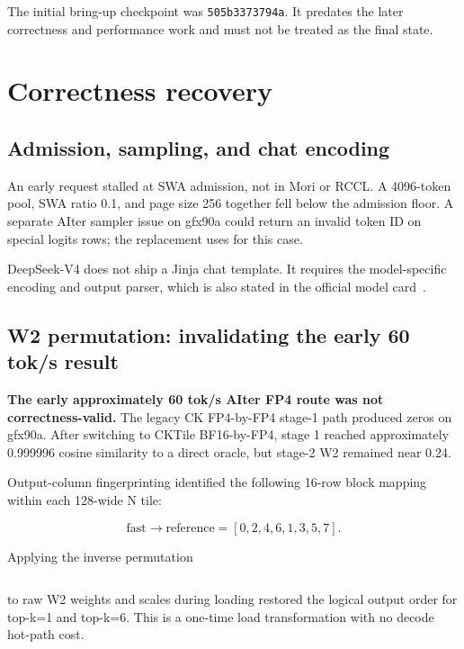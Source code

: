 \documentclass[sigplan,10pt]{acmart}
\newcommand{\risk}[1]{\textbf{#1}}
\newcommand{\commit}[1]{\texttt{#1}}
\begin{document}
The initial bring-up checkpoint was \commit{505b3373794a}. It predates the later correctness and performance work and must not be treated as the final state.

\section{Correctness recovery}

\subsection{Admission, sampling, and chat encoding}

An early request stalled at SWA admission, not in Mori or RCCL. A 4096-token pool, SWA ratio 0.1, and page size 256 together fell below the admission floor. A separate AIter sampler issue on gfx90a could return an invalid token ID on special logits rows; the replacement uses  for this case.

DeepSeek-V4 does not ship a Jinja chat template. It requires the model-specific encoding and output parser, which is also stated in the official model card~\cite{dsv4card}.

\subsection{W2 permutation: invalidating the early 60 tok/s result}

\risk{The early approximately 60 tok/s AIter FP4 route was not correctness-valid.} The legacy CK FP4-by-FP4 stage-1 path produced zeros on gfx90a. After switching to CKTile BF16-by-FP4, stage 1 reached approximately 0.999996 cosine similarity to a direct oracle, but stage-2 W2 remained near 0.24.

Output-column fingerprinting identified the following 16-row block mapping within each 128-wide N tile:

\begin{equation}
  \text{fast}\rightarrow\text{reference}=[0,2,4,6,1,3,5,7].
\end{equation}

Applying the inverse permutation

\begin{equation}
  [0,4,1,5,2,6,3,7]
\end{equation}

to raw W2 weights and scales during loading restored the logical output order for top-k=1 and top-k=6. This is a one-time load transformation with no decode hot-path cost.
\end{document}
